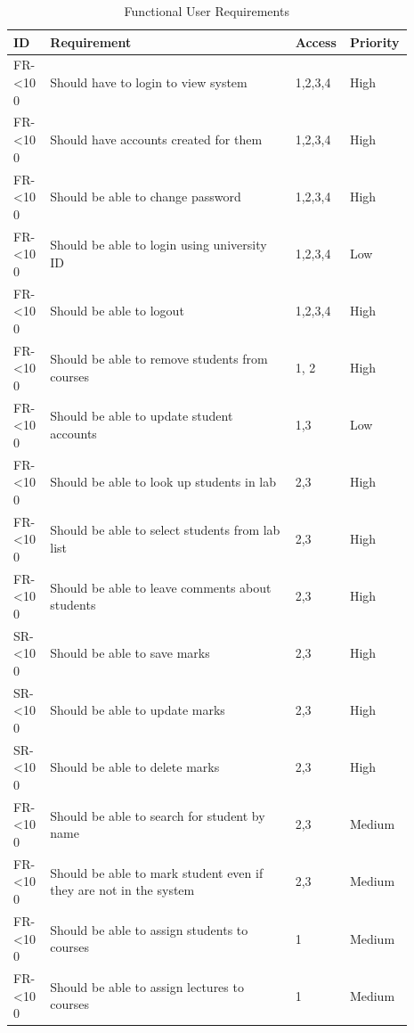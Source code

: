 \documentclass[12pt]{article}  %
\newcommand{\rid}[1]{\centering #1-\ifnum\value{requirement}<10 0\fi\arabic{requirement} \stepcounter{requirement}}
\begin{document}
\begin{spacing}{1.5}
\begin{longtable}{|p{0.09\linewidth}|p{0.6\linewidth}|p{0.1\linewidth}|
p{0.1\linewidth}|}
\caption{Functional User Requirements} \label{table:funct-user} \\
\hline


\textbf{ID} & \textbf{Requirement} & \textbf{Access} & \textbf{Priority}\\
\hline \hline


\rid{FR} & Should have to login to view system & 1,2,3,4 & High\\ \hline
\rid{FR} & Should have accounts created for them & 1,2,3,4 & High\\ \hline
\rid{FR} & Should be able to change password & 1,2,3,4 & High\\ \hline
\rid{FR} & Should be able to login using university ID & 1,2,3,4 & Low\\ \hline
\rid{FR} & Should be able to logout & 1,2,3,4 & High \\ \hline

\rid{FR} & Should be able to remove students from courses & 1, 2 & High\\ \hline
\rid{FR} & Should be able to update student accounts & 1,3 & Low \\ \hline

\rid{FR} & Should be able to look up students in lab & 2,3 & High\\ \hline
\rid{FR} & Should be able  to select students from lab list & 2,3 & High\\ \hline
\rid{FR} & Should be able to leave comments about students & 2,3 & High\\ \hline
\rid{SR} & Should be able to save marks & 2,3 & High\\ \hline
\rid{SR} & Should be able to update marks & 2,3 & High\\ \hline
\rid{SR} & Should be able to delete marks & 2,3 & High\\ \hline
\rid{FR} & Should be able to search for student by name & 2,3 & Medium\\ \hline
\rid{FR} & Should be able to mark student even if they are not in the system & 2,3 & Medium \\ \hline

\rid{FR} & Should be able to assign students to courses & 1 & Medium\\ \hline
\rid{FR} & Should be able to assign lectures to courses & 1 & Medium \\ \hline


\end{longtable}
\end{spacing}
\end{document}
